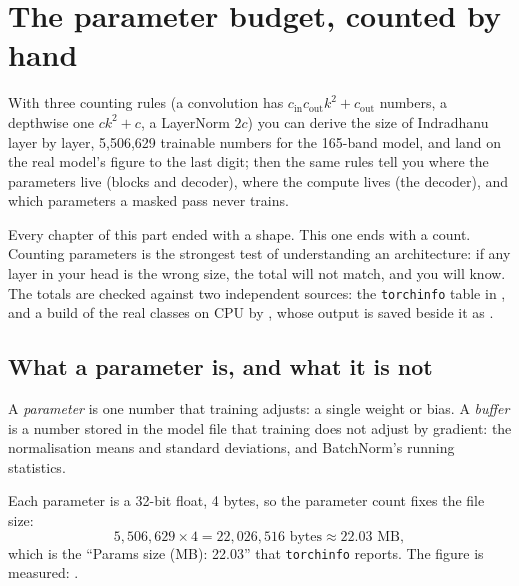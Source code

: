 \chapter{The parameter budget, counted by hand}\label{ch:params}

\begin{onething}
With three counting rules (a convolution has $c_{\text{in}} c_{\text{out}} k^2 + c_{\text{out}}$ numbers,
a depthwise one $c k^2 + c$, a LayerNorm $2c$) you can derive the size of Indradhanu layer by layer,
5,506,629 trainable numbers for the 165-band model, and land on the real model's figure to the last
digit; then the same rules tell you where the parameters live (blocks and decoder), where the compute
lives (the decoder), and which parameters a masked pass never trains.
\end{onething}

Every chapter of this part ended with a shape. This one ends with a count. Counting parameters is the
strongest test of understanding an architecture: if any layer in your head is the wrong size, the total
will not match, and you will know. The totals are checked against two independent sources: the
\texttt{torchinfo} table in , and a
build of the real classes on CPU by , whose output is
saved beside it as .

\section{What a parameter is, and what it is not}\label{sec:params:what}

\begin{definition}
A \emph{parameter} is one number that training adjusts: a single weight or bias. A
\emph{buffer} is a number stored in the model file that training does not adjust by
gradient: the normalisation means and standard deviations, and BatchNorm's running statistics.
\end{definition}

Each parameter is a 32-bit float, 4 bytes, so the parameter count fixes the file size:
\[
5{,}506{,}629 \times 4 = 22{,}026{,}516 \text{ bytes} \approx 22.03 \text{ MB},
\]
which is the ``Params size (MB): 22.03'' that \texttt{torchinfo} reports.
The figure is measured: .


